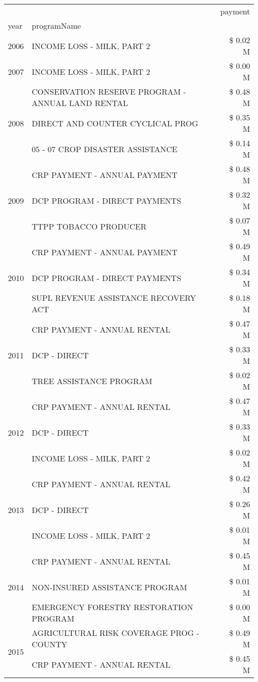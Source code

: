 \begin{tabular}{llr}
\toprule
 &  & payment \\
year & programName &  \\
\midrule
2006 & INCOME LOSS - MILK, PART 2 & \$ 0.02 M \\
\cline{1-3}
2007 & INCOME LOSS - MILK, PART 2 & \$ 0.00 M \\
\cline{1-3}
\multirow[t]{3}{*}{2008} & CONSERVATION RESERVE PROGRAM - ANNUAL LAND RENTAL & \$ 0.48 M \\
 & DIRECT AND COUNTER CYCLICAL PROG & \$ 0.35 M \\
 & 05 - 07 CROP DISASTER ASSISTANCE & \$ 0.14 M \\
\cline{1-3}
\multirow[t]{3}{*}{2009} & CRP PAYMENT - ANNUAL PAYMENT & \$ 0.48 M \\
 & DCP PROGRAM - DIRECT PAYMENTS & \$ 0.32 M \\
 & TTPP TOBACCO PRODUCER & \$ 0.07 M \\
\cline{1-3}
\multirow[t]{3}{*}{2010} & CRP PAYMENT - ANNUAL PAYMENT & \$ 0.49 M \\
 & DCP PROGRAM - DIRECT PAYMENTS & \$ 0.34 M \\
 & SUPL REVENUE ASSISTANCE RECOVERY ACT & \$ 0.18 M \\
\cline{1-3}
\multirow[t]{3}{*}{2011} & CRP PAYMENT - ANNUAL RENTAL & \$ 0.47 M \\
 & DCP - DIRECT & \$ 0.33 M \\
 & TREE ASSISTANCE PROGRAM & \$ 0.02 M \\
\cline{1-3}
\multirow[t]{3}{*}{2012} & CRP PAYMENT - ANNUAL RENTAL & \$ 0.47 M \\
 & DCP - DIRECT & \$ 0.33 M \\
 & INCOME LOSS - MILK, PART 2 & \$ 0.02 M \\
\cline{1-3}
\multirow[t]{3}{*}{2013} & CRP PAYMENT - ANNUAL RENTAL & \$ 0.42 M \\
 & DCP - DIRECT & \$ 0.26 M \\
 & INCOME LOSS - MILK, PART 2 & \$ 0.01 M \\
\cline{1-3}
\multirow[t]{3}{*}{2014} & CRP PAYMENT - ANNUAL RENTAL & \$ 0.45 M \\
 & NON-INSURED ASSISTANCE PROGRAM & \$ 0.01 M \\
 & EMERGENCY FORESTRY RESTORATION PROGRAM & \$ 0.00 M \\
\cline{1-3}
\multirow[t]{3}{*}{2015} & AGRICULTURAL RISK COVERAGE PROG - COUNTY & \$ 0.49 M \\
 & CRP PAYMENT - ANNUAL RENTAL & \$ 0.45 M \\

\end{tabular}
